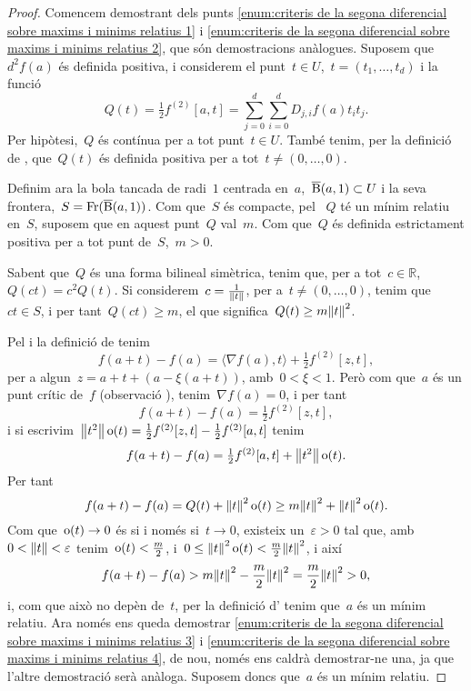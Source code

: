 \documentclass[../../main.tex]{subfiles}
\begin{document}
    \begin{proof}
        Comencem demostrant dels punts \eqref{enum:criteris de la segona diferencial sobre maxims i minims relatius 1} i \eqref{enum:criteris de la segona diferencial sobre maxims i minims relatius 2}, que són demostracions anàlogues.
        Suposem que~\(d^{2}f(a)\) és definida positiva, i considerem el punt~\(t\in U\),~\(t=(t_{1},\dots,t_{d})\) i la funció
        \[
            Q(t)=\tfrac{1}{2}f^{(2)}[a,t]=\sum_{j=0}^{d}\sum_{i=0}^{d}D_{j,i}f(a)t_{i}t_{j}.
        \]
        Per hipòtesi,~\(Q\) és contínua per a tot punt~\(t\in U\).
        També tenim, per la definició de , que~\(Q(t)\) és definida positiva per a tot~\(t\neq(0,\dots,0)\).

        Definim ara la bola tancada de radi~\(1\) centrada en~\(a\),~\(\overline{\operatorname{B}}(a,1)\subset U\) i la seva frontera,~\(S=\operatorname{Fr}(\overline{\operatorname{B}}(a,1))\).
        Com que~\(S\) és compacte, pel  ~\(Q\) té un mínim relatiu en~\(S\), suposem que en aquest punt~\(Q\) val~\(m\).
        Com que~\(Q\) és definida estrictament positiva per a tot punt de~\(S\),~\(m>0\).

        Sabent que~\(Q\) és una forma bilineal simètrica, tenim que, per a tot~\(c\in\mathbb{R}\),~\(Q(ct)=c^{2}Q(t)\).
        Si considerem~\(c=\frac{1}{\norm{t}}\), per a~\(t\neq(0,\dots,0)\), tenim que~\(ct\in S\), i per tant~\(Q(ct)\geq m\), el que significa~\(Q(t)\geq m\norm{t} ^{2}\).

        Pel  i la definició de  tenim
        \[
            f(a+t)-f(a)=\langle\nabla f(a),t\rangle+\tfrac{1}{2}f^{(2)}[z,t],
        \]
        per a algun~\(z=a+t+(a-\xi(a+t))\), amb~\(0<\xi<1\).
        Però com que~\(a\) és un punt crític de~\(f\) (observació ), tenim~\(\nabla f(a)=0\), i per tant
        \[
            f(a+t)-f(a)=\tfrac{1}{2}f^{(2)}[z,t],
        \]
        i si escrivim~\(\norm{t^{2}}\omicron(t)=\frac{1}{2}f^{(2)}[z,t]-\frac{1}{2}f^{(2)}[a,t]\) tenim
        \[
            f(a+t)-f(a)=\tfrac{1}{2}f^{(2)}[a,t]+\norm{t^{2}}\omicron(t).
        \]
        Per tant
        \begin{equation}\label{eq:7}
        f(a+t)-f(a)=Q(t)+\norm{t}^{2}\omicron(t)\geq m\norm{t}^{2}+\norm{t}^{2}\omicron(t).
        \end{equation}
        Com que~\(\operatorname{o}(t)\to0\) és si i només si~\(t\to0\), existeix un~\(\varepsilon>0\) tal que, amb~\(0<\norm{t}<\varepsilon\) tenim~\(\operatorname{o}(t)<\frac{m}{2}\), i~\(0\leq\norm{t}^{2}\omicron(t)<\frac{m}{2}\norm{t}^{2}\), i així
        \[
            f(a+t)-f(a)>m\norm{t}^{2}-\frac{m}{2}\norm{t}^{2}=\frac{m}{2}\norm{t}^{2}>0,
        \]
        i, com que això no depèn de~\(t\), per la definició d' tenim que~\(a\) és un mínim relatiu.
        Ara només ens queda demostrar \eqref{enum:criteris de la segona diferencial sobre maxims i minims relatius 3} i \eqref{enum:criteris de la segona diferencial sobre maxims i minims relatius 4}, de nou, només ens caldrà demostrar-ne una, ja que l'altre demostració serà anàloga.
        Suposem doncs que~\(a\) és un mínim relatiu.


\end{proof}
\end{document}
